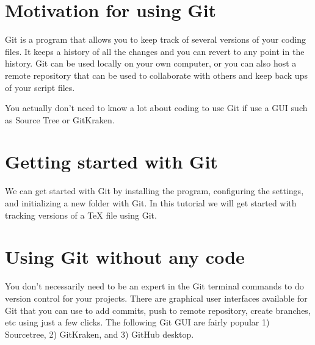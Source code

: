 \documentclass[12pt]{article}
\title{\centering{Introduction to Git}}
\author{Hammad Shaikh}
\begin{document}
\maketitle

\section{Motivation for using Git}
Git is a program that allows you to keep track of several versions of your coding files. It keeps a history of all the changes and you can revert to any point in the history. Git can be used locally on your own computer, or you can also host a remote repository that can be used to collaborate with others and keep back ups of your script files.

You actually don't need to know a lot about coding to use Git if use a GUI such as Source Tree or GitKraken. 

\section{Getting started with Git}
We can get started with Git by installing the program, configuring the settings, and initializing a new folder with Git. In this tutorial we will get started with tracking versions of a TeX file using Git.

\section{Using Git without any code}
You don't necessarily need to be an expert in the Git terminal commands to do version control for your projects. There are graphical user interfaces available for Git that you can use to add commits, push to remote repository, create branches, etc using just a few clicks. The following Git GUI are fairly popular 1)  Sourcetree, 2) GitKraken, and 3) GitHub desktop.
\end{document}
